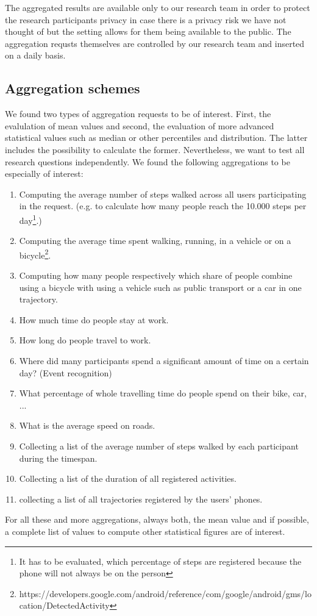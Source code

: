  The aggregated results are available only to our research team in order to protect the research participants privacy in case there is a privacy risk we have not thought of but the setting allows for them being available to the public. The aggregation requsts themselves are controlled by our research team and inserted on a daily basis.

 \subsection{Aggregation schemes}
 We found two types of aggregation requests to be of interest. First, the evalulation of mean values and second, the evaluation of more advanced statistical values such as median or other percentiles and distribution. The latter includes the possibility to calculate the former. Nevertheless, we want to test all research questions independently.
 We found the following aggregations to be especially of interest:
 \begin{enumerate}
 	\item Computing the average number of steps walked across all users participating in the request. (e.g. to calculate how many people reach the 10.000 steps per day\footnote{It has to be evaluated, which percentage of steps are registered because the phone will not always be on the person}.)
	\item Computing the average time spent walking, running, in a vehicle or on a bicycle\footnote{https://developers.google.com/android/reference/com/google/android/gms/location/DetectedActivity}.
	\item Computing how many people respectively which share of people combine using a bicycle with using a vehicle such as public transport or a car in one trajectory.
	\item How much time do people stay at work.
	\item How long do people travel to work.
	\item Where did many participants spend a significant amount of time on a certain day? (Event recognition)
	\item What percentage of whole travelling time do people spend on their bike, car, ...
	\item What is the average speed on roads.

	\item Collecting a list of the average number of steps walked by each participant during the timespan.
	\item Collecting a list of the duration of all registered activities.

	\item collecting a list of all trajectories registered by the users' phones.
 \end{enumerate}
 For all these and more aggregations, always both, the mean value and if possible, a complete list of values to compute other statistical figures are of interest.

